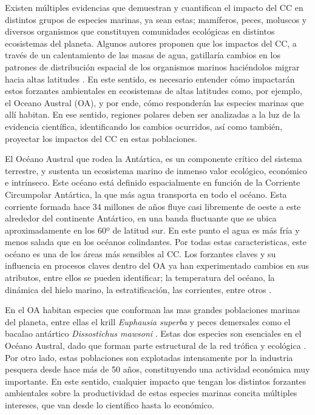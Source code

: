 \documentclass{umagthesis}
\begin{document}
Existen múltiples evidencias que demuestran y cuantifican el impacto del CC en distintos grupos de especies marinas, ya sean estas; mamíferos, peces, moluscos y diversos organismos que constituyen comunidades ecológicas en distintos ecosistemas del planeta. Algunos autores proponen que los impactos del CC, a través de un calentamiento de las masas de agua, gatillaría cambios en los patrones de distribución espacial de los organismos marinos haciéndolos migrar hacia altas latitudes \autocite{Cheung2010a,Kortsch2015,Melbourne-Thomas2021}. En este sentido, es necesario entender cómo impactarán estos forzantes ambientales en ecosistemas de altas latitudes como, por ejemplo, el Oceano Austral (OA), y por ende, cómo responderán las especies marinas que allí habitan. En ese sentido, regiones polares deben ser analizadas a la luz de la evidencia científica, identificando los cambios ocurridos, así como también, proyectar los impactos del CC en estas poblaciones.

El Océano Austral que rodea la Antártica, es un componente crítico del sistema terrestre, y sustenta un ecosistema marino de inmenso valor ecológico, económico e intrínseco. Este océano está definido espacialmente en función de la Corriente Circumpolar Antártica, la que más agua transporta en todo el océano. Esta corriente formada hace 34 millones de años fluye casi libremente de oeste a este alrededor del continente Antártico, en una banda fluctuante que se ubica aproximadamente en los 60º de latitud sur. En este punto el agua es más fría y menos salada que en los océanos colindantes. Por todas estas caracteristicas, este océano es una de los áreas más sensibles al CC. Los forzantes claves y su influencia en procesos claves dentro del OA ya han experimentado cambios en sus atributos, entre ellos se pueden identificar; la temperatura del océano, la dinámica del hielo marino, la estratificación, las corrientes, entre otros \autocite{Sylvester2021,Morley2020}.

En el OA habitan especies que conforman las mas grandes poblaciones marinas del planeta, entre ellas el krill \emph{Euphausia superba} y peces demersales como el bacalao antártico \emph{Dissostichus mawsoni} \autocite{Atkinson2009,Veytia2020,Pinones2016}. Estas dos especies son esenciales en el Océano Austral, dado que forman parte estructural de la red trófica y ecológica \autocite{Pinones2016,Atkinson2009}. Por otro lado, estas poblaciones son explotadas intensamente por la industria pesquera desde hace más de 50 años, constituyendo una actividad económica muy importante. En este sentido, cualquier impacto que tengan los distintos forzantes ambientales sobre la productividad de estas especies marinas concita múltiples intereses, que van desde lo científico hasta lo económico.
\end{document}
